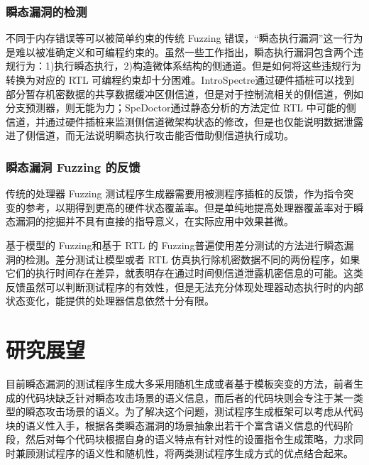 \subsubsection{瞬态漏洞的检测}

不同于内存错误等可以被简单约束的传统 Fuzzing 错误\cite{mahajan2019augmenting}\cite{song2020crfuzz}，“瞬态执行漏洞”这一行为是难以被准确定义和可编程约束的。虽然一些工作\cite{xiao2019speechminer}\cite{ghaniyoun2021introspectre}指出，瞬态执行漏洞包含两个违规行为：1)执行瞬态执行，2)构造微体系结构的侧通道。但是如何将这些违规行为转换为对应的 RTL 可编程约束却十分困难。IntroSpectre\cite{ghaniyoun2021introspectre}通过硬件插桩可以找到部分暂存机密数据的共享数据缓冲区侧信道，但是对于控制流相关的侧信道，例如分支预测器，则无能为力；SpeDoctor\cite{hur2022specdoctor}通过静态分析的方法定位 RTL 中可能的侧信道，并通过硬件插桩来监测侧信道微架构状态的修改，但是也仅能说明数据泄露进了侧信道，而无法说明瞬态执行攻击能否借助侧信道执行成功。\par

\subsubsection{瞬态漏洞 Fuzzing 的反馈}

传统的处理器 Fuzzing 测试程序生成器需要用被测程序插桩的反馈，作为指令突变的参考，以期得到更高的硬件状态覆盖率\cite{hur2021difuzzrtl}\cite{kande2022thehuzz}\cite{laeufer2018rfuzz}。但是单纯地提高处理器覆盖率对于瞬态漏洞的挖掘并不具有直接的指导意义，在实际应用中效果甚微。\par
基于模型的 Fuzzing\cite{oleksenko2022revizor}\cite{hofmann2023speculation}和基于 RTL 的 Fuzzing\cite{hur2022specdoctor}普遍使用差分测试的方法进行瞬态漏洞的检测。差分测试让模型或者 RTL 仿真执行除机密数据不同的两份程序，如果它们的执行时间存在差异，就表明存在通过时间侧信道泄露机密信息的可能。这类反馈虽然可以判断测试程序的有效性，但是无法充分体现处理器动态执行时的内部状态变化，能提供的处理器信息依然十分有限。

\section{研究展望}

目前瞬态漏洞的测试程序生成大多采用随机生成或者基于模板突变的方法，前者生成的代码块缺乏针对瞬态攻击场景的语义信息，而后者的代码块则会专注于某一类型的瞬态攻击场景的语义。为了解决这个问题，测试程序生成框架可以考虑从代码块的语义性入手，根据各类瞬态漏洞的场景抽象出若干个富含语义信息的代码阶段，然后对每个代码块根据自身的语义特点有针对性的设置指令生成策略，力求同时兼顾测试程序的语义性和随机性，将两类测试程序生成方式的优点结合起来。\par

